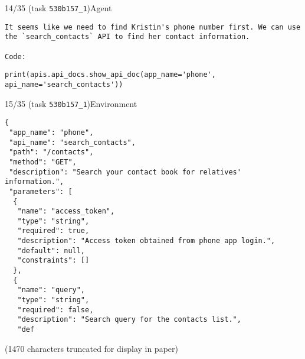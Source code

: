 \begin{minipage}{0.95\linewidth}
\begin{assistant_message_box}{{14/35 (task \texttt{530b157\_1})\hfill Agent}}
\scriptsize
\begin{Verbatim}[breaklines]
It seems like we need to find Kristin's phone number first. We can use the `search_contacts` API to find her contact information.

Code:
\end{Verbatim}
\begin{tcolorbox}[colback=codebgcolor,boxrule=0pt]\begin{Verbatim}[breaklines]
print(apis.api_docs.show_api_doc(app_name='phone', api_name='search_contacts'))
\end{Verbatim}
\end{tcolorbox}\end{assistant_message_box}
\end{minipage}

\hspace*{8mm}%
\begin{minipage}{0.95\linewidth}
\begin{user_message_box}{{15/35 (task \texttt{530b157\_1})\hfill Environment}}
\scriptsize
\begin{Verbatim}[breaklines]
{
 "app_name": "phone",
 "api_name": "search_contacts",
 "path": "/contacts",
 "method": "GET",
 "description": "Search your contact book for relatives' information.",
 "parameters": [
  {
   "name": "access_token",
   "type": "string",
   "required": true,
   "description": "Access token obtained from phone app login.",
   "default": null,
   "constraints": []
  },
  {
   "name": "query",
   "type": "string",
   "required": false,
   "description": "Search query for the contacts list.",
   "def
\end{Verbatim}
(1470 characters truncated for display in paper)\end{user_message_box}
\end{minipage}

